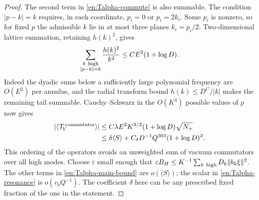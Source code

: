 \begin{proof}
The second term in \eqref{en:Talpha-commute} is also summable.
The condition $|p-k|=k$ requires, in each coordinate,
$p_i=0$ or $p_i=2k_i$.  Some $p_i$ is nonzero, so for fixed $p$
the admissible $k$ lie in at most three planes $k_i=p_i/2$.
Two-dimensional lattice summation, retaining $h(k)^2$, gives
\[
 \sum_{\substack{k\ {\rm high}\\|p-k|=k}}\frac{h(k)^2}{k^2}
       \le CE^2(1+\log D).
\]
Indeed the dyadic sums below a sufficiently large polynomial frequency
are $O(E^2)$ per annulus, and the radial transform bound
$h(k)\le D^C/|k|$ makes the remaining tail summable.
Cauchy--Schwarz in the $O(K^3)$ possible values of $p$ now gives
\begin{align}
 |\langle\mathcal T_V^{\,\rm commutator}\rangle|
 &\le C\lambda E^2K^{3/2}(1+\log D)\sqrt{N_+}\nonumber\\
 &\le\delta\langle S\rangle+
                   C_\delta D^{-1}Q^{303}(1+\log D)^2.
                                                        \label{en:Talpha-resonance}
\end{align}
This ordering of the operators avoids an unweighted sum of vacuum
commutators over all high modes.  Choose $\varepsilon$ small enough
that $\varepsilon B_H\le K^{-1}\sum_{k\ {\rm high}}D_k\|b_k\xi\|^2$.
The other terms in \eqref{en:Talpha-main-bound} are $o(\langle S\rangle)$;
the scalar in \eqref{en:Talpha-resonance} is $o(v_bQ^{-1})$.
The coefficient $\delta$ here can be any prescribed fixed fraction of
the one in the statement.


\end{proof}
